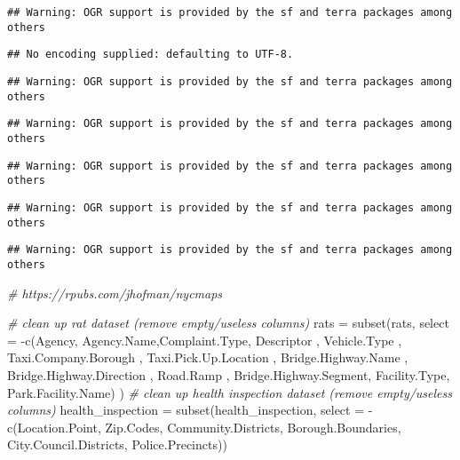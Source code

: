 \documentclass[
]{article}
\newenvironment{Shaded}{\begin{snugshade}}{\end{snugshade}}
\newcommand{\AttributeTok}[1]{\textcolor[rgb]{0.77,0.63,0.00}{#1}}
\newcommand{\CommentTok}[1]{\textcolor[rgb]{0.56,0.35,0.01}{\textit{#1}}}
\newcommand{\FunctionTok}[1]{\textcolor[rgb]{0.00,0.00,0.00}{#1}}
\newcommand{\NormalTok}[1]{#1}
\newcommand{\OtherTok}[1]{\textcolor[rgb]{0.56,0.35,0.01}{#1}}
\newcommand{\SpecialCharTok}[1]{\textcolor[rgb]{0.00,0.00,0.00}{#1}}
\begin{document}
\begin{verbatim}
## Warning: OGR support is provided by the sf and terra packages among others
\end{verbatim}

\begin{verbatim}
## No encoding supplied: defaulting to UTF-8.
\end{verbatim}

\begin{verbatim}
## Warning: OGR support is provided by the sf and terra packages among others
\end{verbatim}

\begin{verbatim}
## Warning: OGR support is provided by the sf and terra packages among others
\end{verbatim}

\begin{verbatim}
## Warning: OGR support is provided by the sf and terra packages among others
\end{verbatim}

\begin{verbatim}
## Warning: OGR support is provided by the sf and terra packages among others
\end{verbatim}

\begin{verbatim}
## Warning: OGR support is provided by the sf and terra packages among others
\end{verbatim}

\begin{Shaded}
\begin{Highlighting}[]
\CommentTok{\# https://rpubs.com/jhofman/nycmaps}


\CommentTok{\# clean up rat dataset (remove empty/useless columns)}
\NormalTok{rats }\OtherTok{=} \FunctionTok{subset}\NormalTok{(rats, }\AttributeTok{select =} \SpecialCharTok{{-}}\FunctionTok{c}\NormalTok{(Agency, Agency.Name,Complaint.Type,  Descriptor ,  Vehicle.Type ,  Taxi.Company.Borough ,  Taxi.Pick.Up.Location , Bridge.Highway.Name ,  Bridge.Highway.Direction ,  Road.Ramp ,  Bridge.Highway.Segment, Facility.Type, Park.Facility.Name) )}
\CommentTok{\# clean up health inspection dataset (remove empty/useless columns)}
\NormalTok{health\_inspection }\OtherTok{=} \FunctionTok{subset}\NormalTok{(health\_inspection, }\AttributeTok{select =} \SpecialCharTok{{-}}\FunctionTok{c}\NormalTok{(Location.Point, Zip.Codes, Community.Districts, Borough.Boundaries, City.Council.Districts, Police.Precincts))}
\end{Highlighting}
\end{Shaded}
\end{document}
